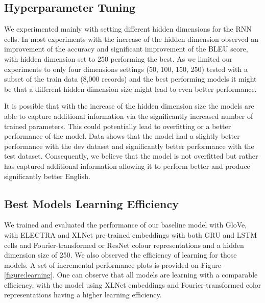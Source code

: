 \subsection{Hyperparameter Tuning}
We experimented mainly with setting different hidden dimensions for the RNN cells. In most experiments with the increase of the hidden dimension observed an improvement of the accuracy and significant improvement of the BLEU score, with hidden dimension set to 250 performing the best. As we limited our experiments to only four dimensions settings (50, 100, 150, 250) tested with a subset of the train data (8,000 records) and the best performing models it might be that a different hidden dimension size might lead to even better performance.

\par
It is possible that with the increase of the hidden dimension size the models are able to capture additional information via the significantly increased number of trained parameters. This could potentially lead to overfitting or a better performance of the model. Data shows that the model had a slightly better performance with the dev dataset and significantly better performance with the test dataset. Consequently, we believe that the model is not overfitted but rather has captured additional information allowing it to perform better and produce significantly better English.

\subsection{Best Models Learning Efficiency}
We trained and evaluated the performance of our baseline model with GloVe, with ELECTRA and XLNet pre-trained embeddings with both GRU and LSTM cells and Fourier-transformed or ResNet colour representations and a hidden dimension size of 250. We also observed the efficiency of learning for those models. A set of incremental performance plots is provided on Figure \ref{figure:learning}. One can observe that all models are learning with a comparable efficiency, with the model using XLNet embeddings and Fourier-transformed color representations having a higher learning efficiency.

